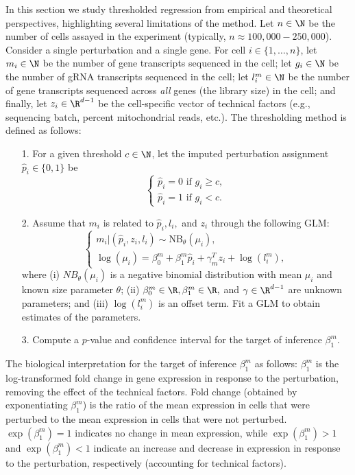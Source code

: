 \documentclass[12pt]{article}
\begin{document}
In this section we study thresholded regression from empirical and theoretical perspectives, highlighting several limitations of the method. Let $n \in \N$ be the number of cells assayed in the experiment (typically, $n \approx 100,000 - 250,000$). Consider a single perturbation and a single gene. For cell $i \in \{1, \dots, n\}$, let $m_i \in \N$ be the number of gene transcripts sequenced in the cell; let $g_i \in \N$ be the number of gRNA transcripts sequenced in the cell; let $l^m_i \in \N$ be the number of gene transcripts sequenced across \textit{all} genes (the library size) in the cell; and finally, let $z_i \in \R^{d-1}$ be the cell-specific vector of technical factors (e.g., sequencing batch, percent mitochondrial reads, etc.). The thresholding method is defined as follows:
\begin{itemize}
\item[1.] For a given threshold $c \in \N$, let the imputed perturbation assignment $\hat{p}_i \in \{0, 1\}$ be $$\begin{cases} \hat{p}_i = 0 \textrm{ if } g_i \geq c, \\ \hat{p}_i = 1 \textrm{ if } g_i < c. \end{cases}$$
\item[2.] Assume that $m_i$ is related to $\hat{p}_i, l_i,$ and $z_i$ through the following GLM:
\begin{equation*}
\begin{cases}
m_i | (\hat{p}_i, z_i, l_i) \sim \textrm{NB}_\theta(\mu_i), \\
\log(\mu_i) = \beta^m_0 + \beta^m_1 \hat{p}_i + \gamma^T_m z_i + \log\left( l_i^m\right),
\end{cases}
\end{equation*}
where (i) $NB_\theta(\mu_i)$ is a negative binomial distribution with mean $\mu_i$ and known size parameter $\theta$; (ii) $\beta^m_0 \in \R, \beta^m_1 \in \R,$ and $\gamma \in  \R^{d-1}$ are unknown parameters; and (iii) $\log(l_i^m)$ is an offset term. Fit a GLM to obtain estimates of the parameters.

\item[3.] Compute a $p$-value and confidence interval for the target of inference $\beta^m_1$.
\end{itemize}

The biological interpretation for the target of inference $\beta^m_1$ as follows:  $\beta^m_1$ is the log-transformed fold change in gene expression in response to the perturbation, removing the effect of the technical factors. Fold change (obtained by exponentiating $\beta^m_1$) is the ratio of the mean expression in cells that were perturbed to the mean expression in cells that were not perturbed. $\exp(\beta^m_1) = 1$ indicates no change in mean expression, while $\exp(\beta^m_1) > 1$ and $\exp(\beta^m_1) < 1$ indicate an increase and decrease in expression in response to the perturbation, respectively (accounting for technical factors).
\end{document}

